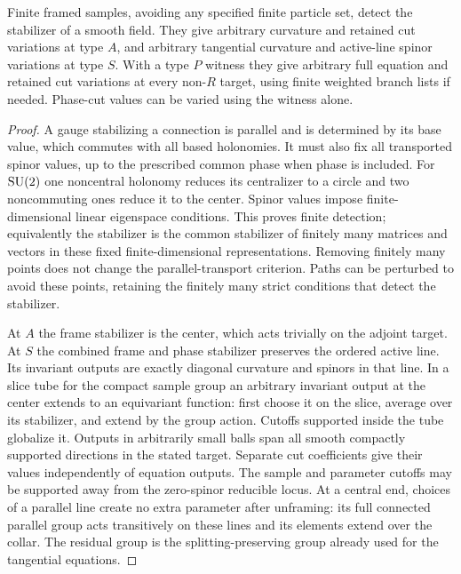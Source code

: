 \begin{lemma}
\label{lem:analysis:samples}
Finite framed samples, avoiding any specified finite particle set,
detect the stabilizer of a smooth field.  They give arbitrary curvature
and retained cut variations at type $A$, and arbitrary tangential
curvature and active-line spinor variations at type $S$.  With a type
$P$ witness they give arbitrary full equation and retained cut variations
at every non-$R$ target, using finite weighted branch lists if needed.
Phase-cut values can be varied using the witness alone.
\end{lemma}
\begin{proof}
A gauge stabilizing a connection is parallel and is determined by its
base value, which commutes with all based holonomies.  It must also fix
all transported spinor values, up to the prescribed common phase when
phase is included.  For $\operatorname{SU}(2)$ one noncentral holonomy reduces its
centralizer to a circle and two noncommuting ones reduce it to the
center.  Spinor values impose finite-dimensional linear eigenspace
conditions.  This proves finite detection; equivalently the stabilizer
is the common stabilizer of finitely many matrices and vectors in these
fixed finite-dimensional representations.  Removing finitely many
points does not change the parallel-transport criterion.  Paths can be
perturbed to avoid these points, retaining the finitely many strict
conditions that detect the stabilizer.

At $A$ the frame stabilizer is the center, which acts trivially on the
adjoint target.  At $S$ the combined frame and phase stabilizer preserves
the ordered active line.  Its invariant outputs are exactly diagonal
curvature and spinors in that line.  In a slice tube for the compact
sample group an arbitrary invariant output at the center extends to an
equivariant function: first choose it on the slice, average over its
stabilizer, and extend by the group action.  Cutoffs supported inside
the tube globalize it.  Outputs in arbitrarily small balls span all
smooth compactly supported directions in the stated target.  Separate
cut coefficients give their values independently of equation outputs.
The sample and parameter cutoffs may be supported away from the
zero-spinor reducible locus.  At a central end, choices of a parallel
line create no extra parameter after unframing: its full connected
parallel group acts transitively on these lines and its elements extend
over the collar.  The residual group is the splitting-preserving group
already used for the tangential equations.


\end{proof}
